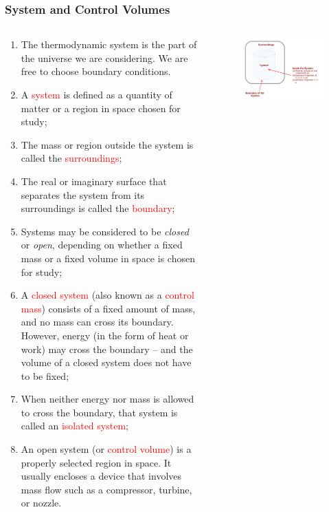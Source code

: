\documentclass[10pt,compress]{beamer}
\begin{document}
\scriptsize
\begin{frame}
 \frametitle{System and Control Volumes}
  \begin{columns}
    \begin{column}[l]{0.6\linewidth}
      \begin{enumerate}\scriptsize
       \item <1-> The thermodynamic system is the part of the universe we are considering. We are free to choose boundary conditions.
       \item <2-> A \textcolor{red}{system} is defined as a quantity of matter or a region in space chosen for study;
       \item <3-> The mass or region outside the system is called the \textcolor{red}{surroundings};
       \item <4-> The real or imaginary surface that separates the system from its surroundings is called the \textcolor{red}{boundary};
       \item <5-> Systems may be considered to be {\it closed} or {\it open}, depending on whether a fixed mass or a fixed volume in space is chosen for study; 
       \item <6-> A \textcolor{red}{closed system} (also known as a \textcolor{red}{control mass}) consists of a fixed amount of mass, and no mass can cross its boundary. However, energy (in the form of heat or work) may cross the boundary -- and the volume of a closed system does not have to be fixed; 
       \item <7-> When neither energy nor mass is allowed to cross the boundary, that system is called an \textcolor{red}{isolated system};
       \item <8-> An open system (or \textcolor{red}{control volume}) is a properly selected region in space. It usually encloses a device that involves mass flow such as a compressor, turbine, or nozzle.
      \end{enumerate} 
    \end{column}
    \begin{column}[l]{0.4\linewidth}\scriptsize
      \begin{figure}%
        \begin{center}
          \includegraphics[width=\columnwidth,clip]{./../Pics/Fig_SystemDefinition}

\end{center}
\end{figure}
\end{column}
\end{columns}
\end{frame}
\end{document}
